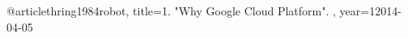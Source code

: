 




@article{thring1984robot,
  title={1.	"Why Google Cloud Platform". },
  year={12014-04-05}
}



